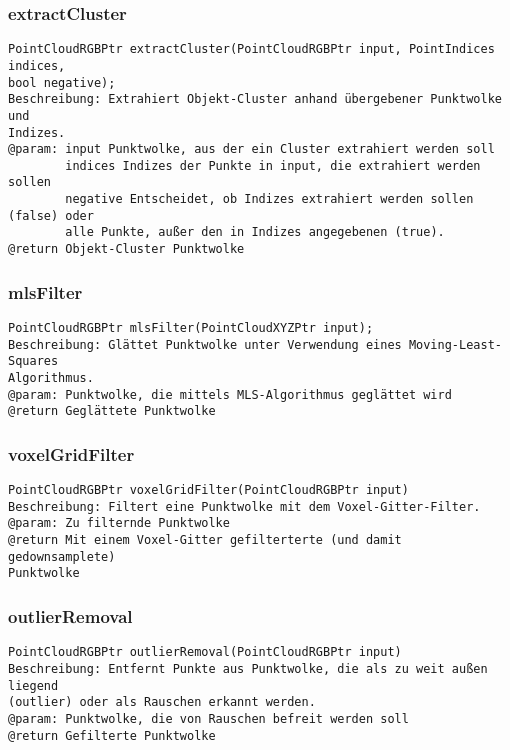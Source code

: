 \documentclass{suturo}
\begin{document}
\subsubsection{extractCluster}
\begin{verbatim}
PointCloudRGBPtr extractCluster(PointCloudRGBPtr input, PointIndices indices, 
bool negative);
Beschreibung: Extrahiert Objekt-Cluster anhand übergebener Punktwolke und
Indizes.
@param: input Punktwolke, aus der ein Cluster extrahiert werden soll
		indices Indizes der Punkte in input, die extrahiert werden sollen
		negative Entscheidet, ob Indizes extrahiert werden sollen (false) oder
		alle Punkte, außer den in Indizes angegebenen (true).
@return Objekt-Cluster Punktwolke
\end{verbatim}\label{func:extractcluster}

\subsubsection{mlsFilter}
\begin{verbatim}
PointCloudRGBPtr mlsFilter(PointCloudXYZPtr input);
Beschreibung: Glättet Punktwolke unter Verwendung eines Moving-Least-Squares
Algorithmus.
@param: Punktwolke, die mittels MLS-Algorithmus geglättet wird
@return Geglättete Punktwolke
\end{verbatim}\label{func:mlsfilter}

\subsubsection{voxelGridFilter}
\begin{verbatim}
PointCloudRGBPtr voxelGridFilter(PointCloudRGBPtr input)
Beschreibung: Filtert eine Punktwolke mit dem Voxel-Gitter-Filter.
@param: Zu filternde Punktwolke
@return Mit einem Voxel-Gitter gefilterterte (und damit gedownsamplete)
Punktwolke
\end{verbatim}\label{func:voxelgridfilter}

\subsubsection{outlierRemoval}
\begin{verbatim}
PointCloudRGBPtr outlierRemoval(PointCloudRGBPtr input)
Beschreibung: Entfernt Punkte aus Punktwolke, die als zu weit außen liegend
(outlier) oder als Rauschen erkannt werden.
@param: Punktwolke, die von Rauschen befreit werden soll
@return Gefilterte Punktwolke
\end{verbatim}\label{func:outlierremoval}
\end{document}
